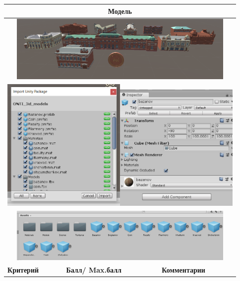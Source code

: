 \begin{longtable}{|p{4cm}|p{2.5cm}|p{7.5cm}|}
    \hline
    \multicolumn{3}{|c|}{\textbf{Модель}} \\
    \hline
    \multicolumn{3}{|c|}{\includegraphics[width=11cm]{src/crit_1}}\\
    \multicolumn{3}{|c|}{\includegraphics[width=6cm]{src/crit_2}\includegraphics[width=6cm]{src/crit_3}}\\
    \multicolumn{3}{|c|}{\includegraphics[width=11cm]{src/crit_4}} \\
    \hline
    \textbf{Критерий} & \textbf{Балл/ Max.балл} & \textbf{Комментарии} \\
    \hline

\end{longtable}
